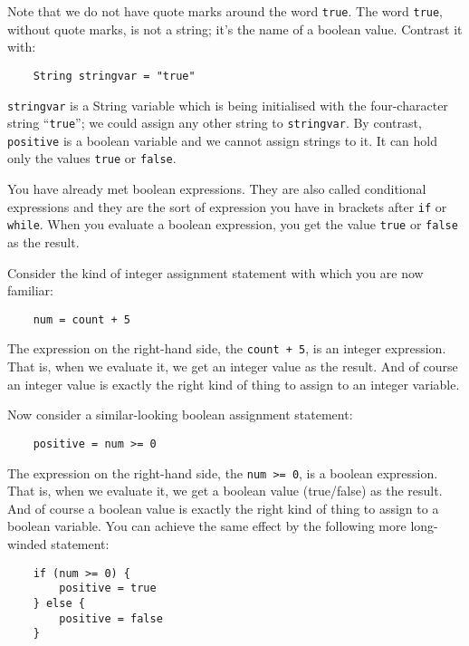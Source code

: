 Note that we do not have quote marks around the word \texttt{true}.  
The word \texttt{true}, without quote marks, is not a string; it's the name of a
boolean value.  Contrast it with:

\begin{Verbatim}
    String stringvar = "true"
\end{Verbatim}

\texttt{stringvar} is a String variable which is being initialised
with the four-character string ``\texttt{true}''; we could assign any
other string to \texttt{stringvar}. By contrast, \texttt{positive}
is a boolean variable and we cannot assign strings to it.
It can hold only the values \texttt{true} or \texttt{false}.

You have already met boolean expressions.  They are also called conditional
expressions and they are the sort of expression you have in brackets
after \texttt{if} or \texttt{while}.  When you evaluate a boolean expression,
you get the value \texttt{true} or \texttt{false} as the result.

Consider the kind of integer assignment statement with which you are
now familiar:

\begin{Verbatim}
    num = count + 5
\end{Verbatim}

The expression on the right-hand side, the \texttt{count + 5}, is an
integer expression.  That is, when we evaluate it, we get an integer value
as the result.  And of course an integer value is exactly the right kind of
thing to assign to an integer variable.

Now consider a similar-looking boolean assignment statement:

\begin{Verbatim}
    positive = num >= 0
\end{Verbatim}

The expression on the right-hand side, the \texttt{num >= 0}, is a
boolean expression.  That is, when we evaluate it, we get a boolean value
(true/false) as the result.  And of course a boolean value is exactly the
right kind of thing to assign to a boolean variable.  You can achieve
the same effect by the following more long-winded statement:

\begin{Verbatim}
    if (num >= 0) {
        positive = true
    } else {
        positive = false
    }
\end{Verbatim}


